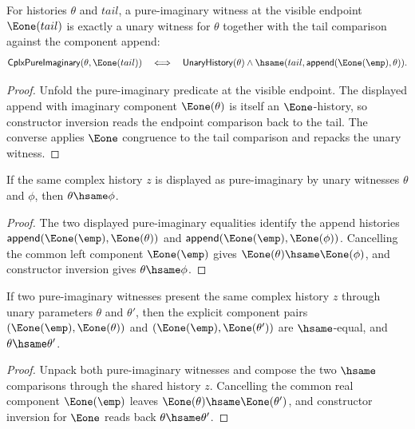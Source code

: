 \begin{theorem}
\label{thm:cplx-pure-imaginary-e1-tail-iff}
For histories $\theta$ and $tail$, a pure-imaginary witness at the visible
endpoint $\Eone(tail)$ is exactly a unary witness for $\theta$ together with
the tail comparison against the component append:
$$
\mathsf{CplxPureImaginary}(\theta,\Eone(tail))
\quad\Longleftrightarrow\quad
\mathsf{UnaryHistory}(\theta)\wedge
\hsame(tail,\mathsf{append}(\Eone(\emp),\theta)).
$$
\end{theorem}
\begin{proof}
Unfold the pure-imaginary predicate at the visible endpoint. The displayed
append with imaginary component $\Eone(\theta)$ is itself an $\Eone$-history,
so constructor inversion reads the endpoint comparison back to the tail.
The converse applies $\Eone$ congruence to the tail comparison and repacks the
unary witness.
\end{proof}

\begin{theorem}
\label{thm:cplx-pure-imaginary-witness-unique}
If the same complex history \(z\) is displayed as pure-imaginary by unary
witnesses \(\theta\) and \(\phi\), then \(\theta\hsame\phi\).
\end{theorem}
\begin{proof}
The two displayed pure-imaginary equalities identify the append histories
\(\mathsf{append}(\Eone(\emp),\Eone(\theta))\) and
\(\mathsf{append}(\Eone(\emp),\Eone(\phi))\). Cancelling the common left
component \(\Eone(\emp)\) gives \(\Eone(\theta)\hsame\Eone(\phi)\), and
constructor inversion gives \(\theta\hsame\phi\).
\end{proof}

\begin{theorem}
\label{thm:cplx-pure-imaginary-component-deterministic}
If two pure-imaginary witnesses present the same complex history $z$ through
unary parameters $\theta$ and $\theta'$, then the explicit component pairs
$(\Eone(\emp),\Eone(\theta))$ and $(\Eone(\emp),\Eone(\theta'))$ are
$\hsame$-equal, and $\theta\hsame\theta'$.
\end{theorem}
\begin{proof}
Unpack both pure-imaginary witnesses and compose the two $\hsame$ comparisons
through the shared history $z$. Cancelling the common real component
$\Eone(\emp)$ leaves $\Eone(\theta)\hsame\Eone(\theta')$, and constructor
inversion for $\Eone$ reads back $\theta\hsame\theta'$.
\end{proof}

